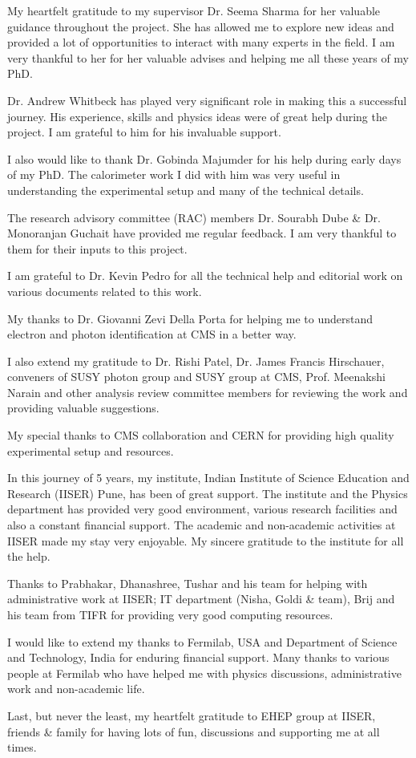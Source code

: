 \documentclass[
11pt, %
english, %
singlespacing, %
headsepline, %
]{MastersDoctoralThesis} %
\begin{document}
\begin{acknowledgements}
\addchaptertocentry{\acknowledgementname} %
My heartfelt gratitude to my supervisor Dr. Seema Sharma for her valuable guidance throughout the project.
She has allowed me to explore new ideas and provided a lot of opportunities to interact with many experts in the field.
I am very thankful to her for her valuable advises and helping me all these years of my PhD.

Dr. Andrew Whitbeck has played very significant role in making this a successful journey.
His experience, skills and physics ideas were of great help during the project. I am grateful to him for his invaluable support.

I also would like to thank Dr. Gobinda Majumder for his help during early days of my PhD.
The calorimeter work I did with him was very useful in understanding the experimental setup and many of the technical details.

The research advisory committee (RAC) members Dr. Sourabh Dube \& Dr. Monoranjan Guchait have provided me regular feedback.
I am very thankful to them for their inputs to this project.

I am grateful to Dr. Kevin Pedro for all the technical help and editorial work on various documents related to this work.

My thanks to Dr. Giovanni Zevi Della Porta for helping me to understand electron and photon identification at CMS in a better way.

I also extend my gratitude to Dr. Rishi Patel, Dr. James Francis Hirschauer, conveners of SUSY photon group and SUSY group at
CMS, Prof. Meenakshi Narain and other analysis review committee members for reviewing the work and providing valuable suggestions.

My special thanks to CMS collaboration and CERN for providing high quality experimental setup and resources.

In this journey of 5 years, my institute, Indian Institute of Science Education and Research (IISER) Pune, has been of great support.
The institute and the Physics department has provided very good environment, various research facilities and also a constant financial 
support. The academic and non-academic activities at IISER made my stay very enjoyable. My sincere gratitude to the institute for all the help.

Thanks to Prabhakar, Dhanashree, Tushar and his team for helping with administrative work at IISER; IT department (Nisha, Goldi \& team), Brij and his team from TIFR for providing very good computing resources.

I would like to extend my thanks to Fermilab, USA and Department of Science and Technology, India for enduring financial support. Many 
thanks to various people at Fermilab who have helped me with physics discussions, administrative work and non-academic life.

Last, but never the least, my heartfelt gratitude to EHEP group at IISER, friends \& family for having lots of fun, discussions and 
supporting me at all times.
\end{acknowledgements}
\end{document}
